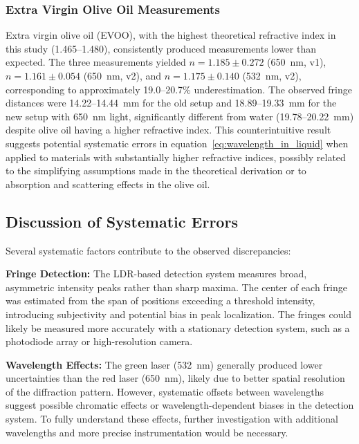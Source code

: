 \subsubsection{Extra Virgin Olive Oil Measurements}

Extra virgin olive oil (EVOO), with the highest theoretical refractive index
in this study (1.465--1.480), consistently produced measurements lower than
expected.
The three measurements yielded $n = 1.185 \pm 0.272$ (650~nm, v1),
$n = 1.161 \pm 0.054$ (650~nm, v2), and $n = 1.175 \pm 0.140$ (532~nm,
v2), corresponding to approximately 19.0--20.7\% underestimation.
The observed fringe distances were 14.22--14.44~mm for the old setup
and 18.89--19.33~mm for the new setup with 650~nm light, significantly
different from water (19.78--20.22~mm) despite olive oil having a
higher refractive index.
This counterintuitive result suggests potential systematic errors in
equation~\eqref{eq:wavelength_in_liquid} when applied to materials with
substantially higher refractive indices, possibly related to the simplifying
assumptions made in the theoretical derivation or to absorption and scattering
effects in the olive oil.

\subsection{Discussion of Systematic Errors}
\label{subsec:discussion-of-systematic-errors}

Several systematic factors contribute to the observed discrepancies:

\textbf{Fringe Detection:} The LDR-based detection system measures
broad, asymmetric intensity peaks rather than sharp maxima.
The center of each fringe was estimated from the span of positions
exceeding a threshold intensity, introducing subjectivity and potential
bias in peak localization.
The fringes could likely be measured more accurately with a stationary
detection system, such as a photodiode array or high-resolution camera.

\textbf{Wavelength Effects:} The green laser (532~nm) generally
produced lower uncertainties than the red laser (650~nm), likely due to
better spatial resolution of the diffraction pattern.
However, systematic offsets between wavelengths suggest possible
chromatic effects or wavelength-dependent biases in the detection
system.
To fully understand these effects, further investigation with additional
wavelengths and more precise instrumentation would be necessary.


